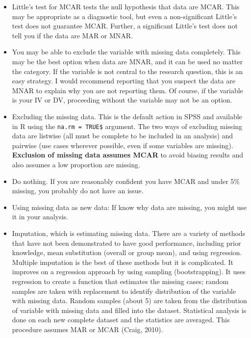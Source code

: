 \documentclass[
]{book}
\begin{document}
\begin{itemize}
\item
  Little's test for MCAR tests the null hypothesis that data are MCAR. This may be appropriate as a diagnostic tool, but even a non-significant Little's test does not guarantee MCAR. Further, a significant Little's test does not tell you if the data are MAR or MNAR.
\item
  You may be able to exclude the variable with missing data completely. This may be the best option when data are MNAR, and it can be used no matter the category. If the variable is not central to the research question, this is an easy strategy. I would recommend reporting that you suspect the data are MNAR to explain why you are not reporting them. Of course, if the variable is your IV or DV, proceeding without the variable may not be an option.
\item
  Excluding the missing data. This is the default action in SPSS and available in R using the \texttt{na.rm\ =\ TRUE\textasciigrave{}\$} argument. The two ways of excluding missing data are listwise (all must be complete to be included in an analysis) and pairwise (use cases wherever possible, even if some variables are missing). \textbf{Exclusion of missing data assumes MCAR} to avoid biasing results and also assumes a low proportion are missing.
\item
  Do nothing. If you are reasonably confident you have MCAR and under 5\% missing, you probably do not have an issue.
\item
  Using missing data as new data: If know why data are missing, you might use it in your analysis.
\item
  Imputation, which is estimating missing data. There are a variety of methods that have not been demonstrated to have good performance, including prior knowledge, mean substitution (overall or group mean), and using regression. Multiple imputation is the best of these methods but it is complicated. It improves on a regression approach by using sampling (bootstrapping). It uses regression to create a function that estimates the missing cases; random samples are taken with replacement to identify distribution of the variable with missing data. Random samples (about 5) are taken from the distribution of variable with missing data and filled into the dataset. Statistical analysis is done on each new complete dataset and the statistics are averaged. This procedure assumes MAR or MCAR (Craig, 2010).
\end{itemize}
\end{document}
